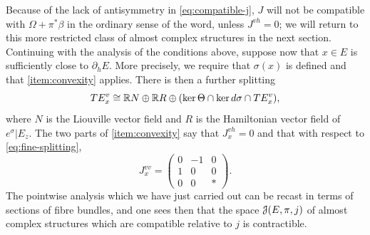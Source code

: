 \documentclass[10pt,letterpaper]{article}
\begin{document}
Because of the lack of antisymmetry in \eqref{eq:compatible-j}, $J$ will not be
compatible with $\Omega + \pi^*\beta$ in the ordinary sense of the word, unless
$J^{vh} = 0$; we will return to this more restricted class of almost complex
structures in the next section. Continuing with the analysis of the conditions
above, suppose now that $x \in E$ is sufficiently close to $\partial_hE$. More
precisely, we require that $\sigma(x)$ is defined and that \ref{item:convexity}
applies. There is then a further splitting
\begin{equation} \label{eq:fine-splitting}
TE^v_x \cong \mathbb{R} N \oplus \mathbb{R} R \oplus (\mathrm{ker}\, \Theta \cap \mathrm{ker}\, d\sigma \cap
TE^v_x),
\end{equation}
where $N$ is the Liouville vector field and $R$ is the Hamiltonian vector field
of $e^\sigma|E_z$. The two parts of \ref{item:convexity} say that $J_x^{vh} =
0$ and that with respect to \eqref{eq:fine-splitting},
\begin{equation} \label{eq:boundary-j}
 J_x^{vv} = \begin{pmatrix} 0 & -1 & 0 \\ 1 & 0 & 0 \\ 0 & 0 & * \end{pmatrix}.
\end{equation}
The pointwise analysis which we have just carried out can be recast in terms of
sections of fibre bundles, and one sees then that the space $\mathcal{J}(E,\pi,j)$ of
almost complex structures which are compatible relative to $j$ is contractible.
\end{document}
